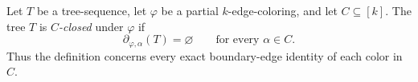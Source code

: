 \begin{definition}
Let $T$ be a tree-sequence, let $\varphi$ be a partial $k$-edge-coloring,
and let $C\subseteq[k]$.  The tree $T$ is \emph{$C$-closed} under
$\varphi$ if
\[
 \partial_{\varphi,\alpha}(T)=\varnothing
 \qquad\text{for every }\alpha\in C.
\]
Thus the definition concerns every exact boundary-edge identity of each
color in $C$.
\end{definition}
